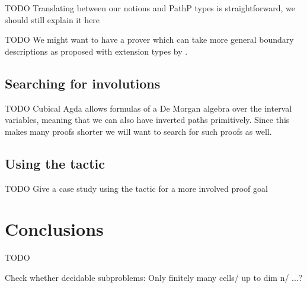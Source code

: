 \documentclass{llncs}
\newcommand{\todo}[1]{
  \begin{tcolorbox}
    TODO {#1} 
  \end{tcolorbox}
}
\begin{document}
\todo{Translating between our notions and PathP types is straightforward, we
  should still explain it here}

\todo{We might want to have a prover which can take more general boundary
  descriptions as proposed with extension types by \cite{riehl17_type_theor_synth}.}

\subsection{Searching for involutions}
\label{ssec:inverses}

\todo{Cubical Agda allows formulas of a De Morgan algebra over the interval
  variables, meaning that we can also have inverted paths primitively. Since
  this makes many proofs shorter we will want to search for such proofs as well.}

\subsection{Using the tactic}

\todo{Give a case study using the tactic for a more involved proof goal}





\section{Conclusions}
\label{sec:conclusions}

\todo{}

Check whether decidable subproblems: Only finitely many cells/ up to dim n/ ...?







\appendix


\end{document}

